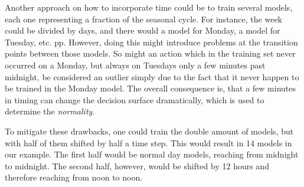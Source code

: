 Another approach on how to incorporate time could be to train several models, each one representing a fraction of the seasonal cycle. For instance, the week could be divided by days, and there would a model for Monday, a model for Tuesday, etc. pp.
However, doing this might introduce problems at the transition points between those models. So might an action which in the training set never occurred on a Monday, but always on Tuesdays only a few minutes past midnight, be considered an outlier simply due to the fact that it never happen to be trained in the Monday model.
The overall consequence is, that a few minutes in timing can change the decision surface dramatically, which is used to determine the \emph{normality.}

To mitigate these drawbacks, one could train the double amount of models, but with half of them shifted by half a time step. This would result in 14 models in our example. The first half would be normal day models, reaching from midnight to midnight. The second half, however, would be shifted by 12 hours and therefore reaching from noon to noon.

